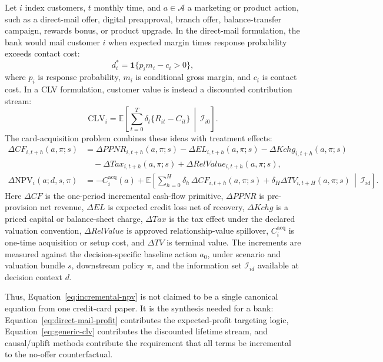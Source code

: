 \documentclass[11pt]{article}
\newcommand{\E}{\mathbb{E}}
\newcommand{\NPV}{\mathrm{NPV}}
\newcommand{\1}{\mathbf{1}}
\begin{document}
Let $i$ index customers, $t$ monthly time, and $a \in \mathcal{A}$ a marketing
or product action, such as a direct-mail offer, digital preapproval, branch
offer, balance-transfer campaign, rewards bonus, or product upgrade. In the
direct-mail formulation, the bank would mail customer $i$ when expected margin
times response probability exceeds contact cost:
\begin{equation}
  d_i^*
  =
  \1\{p_i m_i - c_i > 0\},
  \label{eq:direct-mail-profit}
\end{equation}
where $p_i$ is response probability, $m_i$ is conditional gross margin, and
$c_i$ is contact cost. In a CLV formulation, customer value is instead a
discounted contribution stream:
\begin{equation}
  \mathrm{CLV}_i
  =
  \E\left[
    \sum_{t=0}^{T} \delta_t \{R_{it}-C_{it}\}
    \,\middle|\, \mathcal{I}_{i0}
  \right].
  \label{eq:generic-clv}
\end{equation}
The card-acquisition problem combines these ideas with treatment effects:
\begin{align}
  \Delta CF_{i,t+h}(a,\pi;s)
  &=
  \Delta PPNR_{i,t+h}(a,\pi;s)
  - \Delta EL_{i,t+h}(a,\pi;s)
  - \Delta Kchg_{i,t+h}(a,\pi;s)
  \nonumber\\
  &\quad
  - \Delta Tax_{i,t+h}(a,\pi;s)
  + \Delta RelValue_{i,t+h}(a,\pi;s),
  \label{eq:incremental-cash-flow}\\
  \Delta \NPV_i(a;d,s,\pi)
  &=
  - C_i^{\mathrm{acq}}(a)
  +
  \E\left[
    \sum_{h=0}^{H}
      \delta_h\,\Delta CF_{i,t+h}(a,\pi;s)
    + \delta_H\Delta TV_{i,t+H}(a,\pi;s)
    \,\middle|\, \mathcal{I}_{id}
  \right].
  \label{eq:incremental-npv}
\end{align}
Here $\Delta CF$ is the one-period incremental cash-flow primitive,
$\Delta PPNR$ is pre-provision net revenue, $\Delta EL$ is expected credit loss
net of recovery, $\Delta Kchg$ is a priced capital or balance-sheet charge,
$\Delta Tax$ is the tax effect under the declared valuation convention,
$\Delta RelValue$ is approved relationship-value spillover, $C_i^{\mathrm{acq}}$
is one-time acquisition or setup cost, and $\Delta TV$ is terminal value. The
increments are measured against the decision-specific baseline action $a_0$,
under scenario and valuation bundle $s$, downstream policy $\pi$, and the
information set $\mathcal{I}_{id}$ available at decision context $d$.

Thus, Equation~\eqref{eq:incremental-npv} is not claimed to be a single
canonical equation from one credit-card paper. It is the synthesis needed for a
bank: Equation~\eqref{eq:direct-mail-profit} contributes the expected-profit
targeting logic, Equation~\eqref{eq:generic-clv} contributes the discounted
lifetime stream, and causal/uplift methods contribute the requirement that all
terms be incremental to the no-offer counterfactual.
\end{document}
